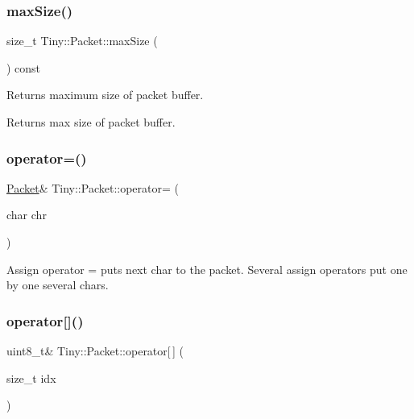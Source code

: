 \subsubsection{\texorpdfstring{max\+Size()}{maxSize()}}
{\footnotesize\ttfamily size\+\_\+t Tiny\+::\+Packet\+::max\+Size (\begin{DoxyParamCaption}{ }\end{DoxyParamCaption}) const\hspace{0.3cm}{\ttfamily [inline]}}

Returns maximum size of packet buffer. \begin{DoxyReturn}{Returns}
max size of packet buffer. 
\end{DoxyReturn}
\mbox{\label{classTiny_1_1Packet_a2de2c7f2c3ea6baaab462dd7e4469ecb}} 
\subsubsection{\texorpdfstring{operator=()}{operator=()}}
{\footnotesize\ttfamily \hyperlink{classTiny_1_1Packet}{Packet}\& Tiny\+::\+Packet\+::operator= (\begin{DoxyParamCaption}\item[{char}]{chr }\end{DoxyParamCaption})\hspace{0.3cm}{\ttfamily [inline]}}

Assign operator = puts next char to the packet. Several assign operators put one by one several chars. \mbox{\label{classTiny_1_1Packet_abfaef504eb88a4db88bca3b907770fa2}} 
\subsubsection{\texorpdfstring{operator[]()}{operator[]()}}
{\footnotesize\ttfamily uint8\+\_\+t\& Tiny\+::\+Packet\+::operator\mbox{[}$\,$\mbox{]} (\begin{DoxyParamCaption}\item[{size\+\_\+t}]{idx }\end{DoxyParamCaption})\hspace{0.3cm}{\ttfamily [inline]}}

